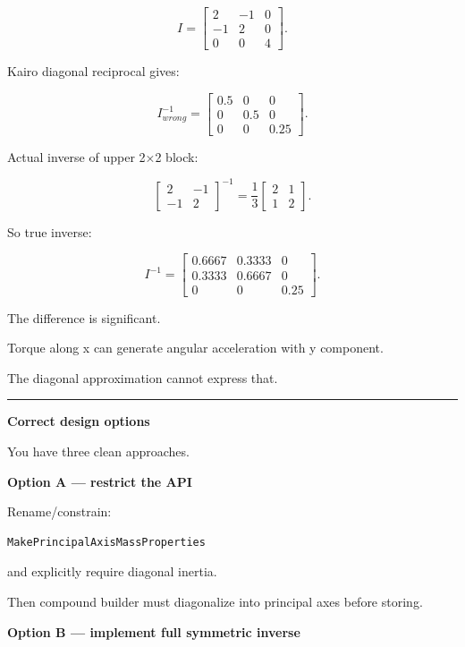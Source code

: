 \[
I=
\begin{bmatrix}
2&-1&0\\
-1&2&0\\
0&0&4
\end{bmatrix}.
\]

Kairo diagonal reciprocal gives:

\[
I^{-1}_{wrong}
=
\begin{bmatrix}
0.5&0&0\\
0&0.5&0\\
0&0&0.25
\end{bmatrix}.
\]

Actual inverse of upper 2×2 block:

\[
\begin{bmatrix}
2&-1\\
-1&2
\end{bmatrix}^{-1}
=
\frac13
\begin{bmatrix}
2&1\\
1&2
\end{bmatrix}.
\]

So true inverse:

\[
I^{-1}
=
\begin{bmatrix}
0.6667&0.3333&0\\
0.3333&0.6667&0\\
0&0&0.25
\end{bmatrix}.
\]

The difference is significant.

Torque along x can generate angular acceleration with y component.

The diagonal approximation cannot express that.

\begin{center}\rule{0.5\linewidth}{0.5pt}\end{center}

\textbf{Correct design options}

You have three clean approaches.

\textbf{Option A --- restrict the API}

Rename/constrain:

\begin{verbatim}
MakePrincipalAxisMassProperties
\end{verbatim}

and explicitly require diagonal inertia.

Then compound builder must diagonalize into principal axes before storing.

\textbf{Option B --- implement full symmetric inverse}


